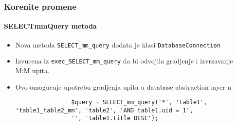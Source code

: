 \begin{frame}[fragile]
	\frametitle{Korenite promene}
	\framesubtitle{SELECTmmQuery metoda}

	\lstset{basicstyle=\tiny\ttfamily}

	\begin{itemize}

		\item Nova metoda \texttt{SELECT\_mm\_query} dodata je klasi \texttt{DatabaseConnection}

		\item Izvucena iz \texttt{exec\_SELECT\_mm\_query} da bi odvojila gradjenje i izvrzavanje M:M upita.

		\item Ovo omogucuje upotrebu gradjenja upita u database abstraction layer-u

			\begin{lstlisting}
				$query = SELECT_mm_query('*', 'table1', 'table1_table2_mm', 'table2', 'AND table1.uid = 1',
				'', 'table1.title DESC');
			\end{lstlisting}

	\end{itemize}

\end{frame}


